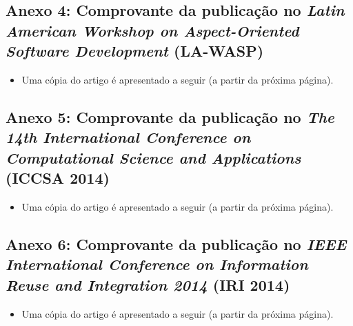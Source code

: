
\subsection*{Anexo 4: Comprovante da publicação no \emph{Latin American Workshop on Aspect-Oriented Software Development} (LA-WASP)} \label{anexo:comprovante_LA_WASP}

\begin{itemize}
	\item Uma cópia do artigo é apresentado a seguir (a partir da próxima página).
\end{itemize}
\clearpage



\subsection*{Anexo 5: Comprovante da publicação no \emph{The 14th International Conference on Computational Science and Applications} (ICCSA 2014)} \label{anexo:comprovante_ICCSA}

\begin{itemize}
	\item Uma cópia do artigo é apresentado a seguir (a partir da próxima página).
\end{itemize}
\clearpage



\subsection*{Anexo 6: Comprovante da publicação no \emph{IEEE International Conference on Information Reuse and Integration 2014} (IRI 2014)} \label{anexo:comprovante_IRI_Rafael}

\begin{itemize}
	\item Uma cópia do artigo é apresentado a seguir (a partir da próxima página).
\end{itemize}
\clearpage


